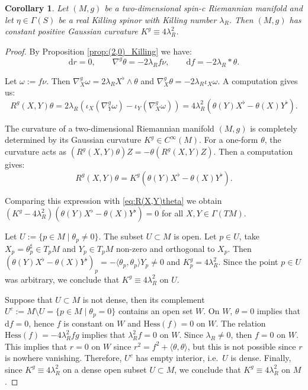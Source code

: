 \documentclass[10pt,a4paper,twoside,reqno]{amsart}
\theoremstyle{plain}
\newtheorem{cor}[thm]{Corollary}
\theoremstyle{definition}
\theoremstyle{remark}
\def\dd{\mathrm{d}}
\def\dd{\mathrm{d}}
\newcommand{\escal}[1]{\langle#1\rangle}
\def\Hess{\mathrm{Hess}}
\begin{document}
\begin{cor}
    Let $(M,g)$ be a two-dimensional spin-c Riemannian manifold and let $\eta\in\Gamma(S)$ be a real Killing spinor with Killing number $\lambda_R$. Then $(M,g)$ has constant positive Gaussian curvature $K^g\equiv4\lambda_R^2$.
\end{cor}

\begin{proof}
    By Proposition \ref{prop:(2,0)_Killing} we have: $$\dd r=0,\qquad \nabla^g\theta=-2\lambda_Rf\nu,\qquad \dd f=-2\lambda_R*\theta.$$

    Let $\omega:=f\nu$. Then $\nabla^g_X\omega=2\lambda_R X^\flat\wedge\theta$ and $\nabla^g_X\theta=-2\lambda_R\iota_X\omega$. A computation gives us: \begin{equation}\label{eq:R(X,Y)theta}
        R^g(X,Y)\theta=2\lambda_R(\iota_X(\nabla^g_Y\omega)-\iota_Y(\nabla^g_X\omega))=4\lambda_R^2(\theta(Y)X^\flat-\theta(X)Y^\flat).
    \end{equation}
    
    The curvature of a two-dimensional Riemannian manifold $(M,g)$ is completely determined by its Gaussian curvature $K^g\in C^\infty(M)$. For a one-form $\theta$, the curvature acts as $(R^g(X,Y)\theta)Z=-\theta(R^g(X,Y)Z)$. Then a computation gives: $$R^g(X,Y)\theta=K^g(\theta(Y)X^\flat-\theta(X)Y^\flat).$$
    
    Comparing this expression with \eqref{eq:R(X,Y)theta} we obtain $(K^g-4\lambda_R^2)(\theta(Y)X^\flat-\theta(X)Y^\flat)=0$ for all $X,Y\in\Gamma(TM)$.\medskip

    Let $U:=\{p\in M\mid \theta_p\neq0\}$. The subset $U\subset M$ is open. Let $p\in U$, take $X_p=\theta^\sharp_p\in T_pM$ and $Y_p\in T_pM$ non-zero and orthogonal to $X_p$. Then $(\theta(Y)X^\flat-\theta(X)Y^\flat)_p=-\escal{\theta_p,\theta_p}Y_p\neq0$ and $K^g_p=4\lambda_R^2$. Since the point $p\in U$ was arbitrary, we conclude that $K^g\equiv4\lambda_R^2$ on $U$.\medskip

    Suppose that $U\subset M$ is not dense, then its complement $U^c:=M\setminus U=\{p\in M\mid\theta_p=0\}$ contains an open set $W$. On $W$, $\theta=0$ implies that $\dd f=0$, hence $f$ is constant on $W$ and $\Hess(f)=0$ on $W$. The relation $\Hess(f)=-4\lambda_R^2fg$ implies that $\lambda_R^2f=0$ on $W$. Since $\lambda_R\neq0$, then $f=0$ on $W$. This implies that $r=0$ on $W$ since $r^2=f^2+\escal{\theta,\theta}$, but this is not possible since $r$ is nowhere vanishing. Therefore, $U^c$ has empty interior, i.e.\ $U$ is dense. Finally, since $K^g\equiv4\lambda_R^2$ on a dense open subset $U\subset M$, we conclude that $K^g\equiv4\lambda_R^2$ on $M$.
\end{proof}
\end{document}
